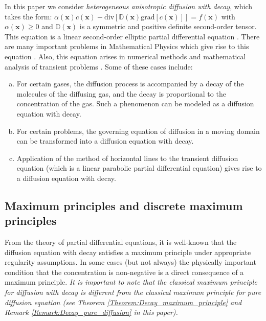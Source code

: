 \documentclass[11pt]{amsart}
\begin{document}
In this paper we consider \emph{heterogeneous anisotropic diffusion with decay}, which 
takes the form: $\alpha(\mathbf{x}) c(\mathbf{x}) - \mathrm{div}[\mathbb{D}(\mathbf{x}) 
\mathrm{grad}[c(\mathbf{x})]] = f(\mathbf{x})$ with $\alpha(\mathbf{x}) \geq 0$ and 
$\mathbb{D}(\mathbf{x})$ is a symmetric and positive definite second-order tensor. 
This equation is a linear second-order elliptic partial differential equation 
\cite{Gilbarg_Trudinger}. There are many important problems in Mathematical Physics 
which give rise to this equation \cite{Tikhonov_Samarskii}. Also, this equation 
arises in numerical methods and mathematical analysis of transient problems 
\cite{Ladyzhenskaya_Mathematical_Physics}. Some of these cases include:
\begin{enumerate}[(a)]
\item For certain gases, the diffusion process is accompanied by a decay of the molecules 
  of the diffusing gas, and the decay is proportional to the concentration of the gas. 
  Such a phenomenon can be modeled as a diffusion equation with decay. 
\item For certain problems, the governing equation of diffusion in a moving domain can be 
  transformed into a diffusion equation with decay. 
\item Application of the method of horizontal lines to the transient diffusion equation 
  (which is a linear parabolic partial differential equation) gives rise to a diffusion 
  equation with decay. 
\end{enumerate}

\subsection{Maximum principles and discrete maximum principles}
From the theory of partial differential equations, it is well-known that the diffusion equation 
with decay satisfies a maximum principle under appropriate regularity assumptions. In some 
cases (but not always) the physically important condition that the concentration is non-negative 
is a direct consequence of a maximum principle. \emph{It is important to note that the classical 
maximum principle for diffusion with decay is different from the classical maximum principle for 
pure diffusion equation (see Theorem \ref{Theorem:Decay_maximum_principle} and Remark 
\ref{Remark:Decay_pure_diffusion} in this paper).} 
\end{document}
